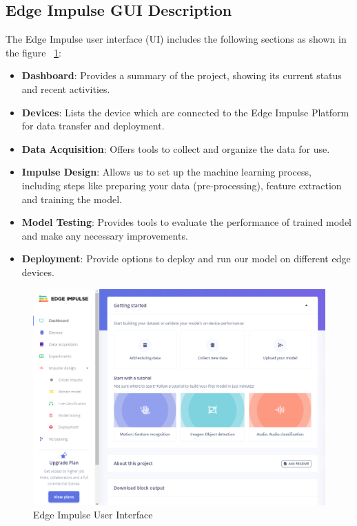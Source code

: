\subsection{Edge Impulse GUI Description}
The Edge Impulse user interface (UI) includes the following sections as shown in the figure ~\ref{UIEdgeImpluse}:
\begin{itemize}
	\item \textbf{Dashboard}: Provides a summary of the project, showing its current status and recent activities.
	\item \textbf{Devices}: Lists the device which are connected to the Edge Impulse Platform for data transfer and deployment.
	\item \textbf{Data Acquisition}: Offers tools to collect and organize the data for use.
	\item \textbf{Impulse Design}: Allows us to set up the machine learning process, including steps like preparing your data (pre-processing), feature extraction and training the model.
	\item \textbf{Model Testing}: Provides tools to evaluate the performance of trained model and make any necessary improvements.
	\item \textbf{Deployment}: Provide options to deploy and run our model on different edge devices.
\end{itemize}

\begin{figure}
	\begin{center}
		\includegraphics[width=0.7\linewidth]{Images/EdgeImpulse/UI.png}
		\caption{Edge Impulse User Interface}
		\label{UIEdgeImpluse}
	\end{center}
\end{figure}

